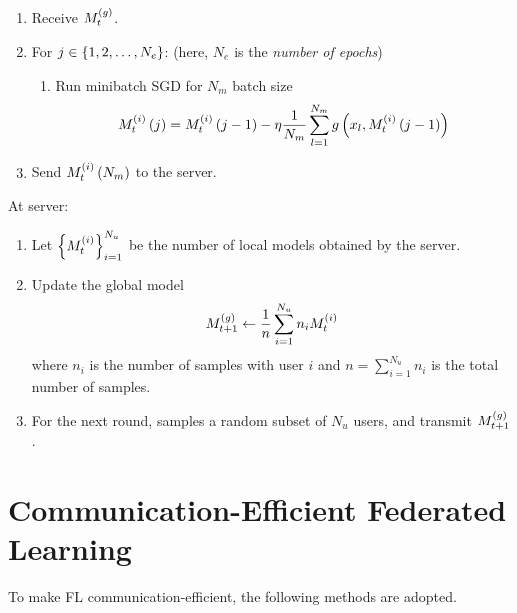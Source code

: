 \documentclass[twoside]{article}
\begin{document}
\begin{enumerate}
    \item Receive \(M_t^{\left(g\right)}\).
    \item For \(j \in \left\{1,2,\ldots,N_e\right\}\):
    (here, \(N_e\) is the \emph{number of epochs})
    \begin{enumerate}
        \item Run minibatch SGD for \(N_m\) batch size
        \begin{equation}
            M_t^{\left(i\right)}\left(j\right) = M_t^{\left(i\right)}\left(j-1\right) - \eta\frac{1}{N_m}\sum_{l=1}^{N_m}g\left(x_l,M_t^{\left(i\right)}\left(j-1\right)\right)
            \label{eq:sgd-update}
        \end{equation}
    \end{enumerate}
    \item Send \(M_t^{\left(i\right)}\left(N_m\right)\) to the server.
\end{enumerate}

At server:

\begin{enumerate}
    \item Let \(\left\{M_t^{\left(i\right)}\right\}_{i=1}^{N_u}\) be the number of local
    models obtained by the server.
    \item Update the global model
    \begin{equation}
        M_{t+1}^{\left(g\right)} \leftarrow \frac{1}{n}\sum_{i=1}^{N_u}n_iM_t^{\left(i\right)}
        \label{eq:sgd-server-update}
    \end{equation}
    where \(n_i\) is the number of samples with user \(i\) and \(n = 
    \sum_{i=1}^{N_u}n_i\) is the total number of samples.
    \item For the next round, samples a random subset of \(N_u\) users, and 
    transmit \(M_{t+1}^{\left(g\right)}\).
\end{enumerate}

\section{Communication-Efficient Federated Learning}

To make FL communication-efficient, the following methods are adopted.
\end{document}
